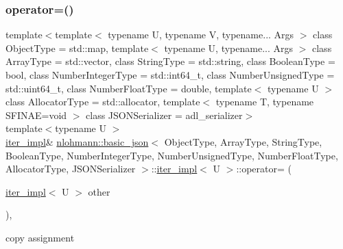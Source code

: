 \subsubsection{\texorpdfstring{operator=()}{operator=()}}
{\footnotesize\ttfamily template$<$template$<$ typename U, typename V, typename... Args $>$ class Object\+Type = std\+::map, template$<$ typename U, typename... Args $>$ class Array\+Type = std\+::vector, class String\+Type  = std\+::string, class Boolean\+Type  = bool, class Number\+Integer\+Type  = std\+::int64\+\_\+t, class Number\+Unsigned\+Type  = std\+::uint64\+\_\+t, class Number\+Float\+Type  = double, template$<$ typename U $>$ class Allocator\+Type = std\+::allocator, template$<$ typename T, typename S\+F\+I\+N\+A\+E=void $>$ class J\+S\+O\+N\+Serializer = adl\+\_\+serializer$>$ \\
template$<$typename U $>$ \\
\mbox{\hyperlink{classnlohmann_1_1basic__json_1_1iter__impl}{iter\+\_\+impl}}\& \mbox{\hyperlink{classnlohmann_1_1basic__json}{nlohmann\+::basic\+\_\+json}}$<$ Object\+Type, Array\+Type, String\+Type, Boolean\+Type, Number\+Integer\+Type, Number\+Unsigned\+Type, Number\+Float\+Type, Allocator\+Type, J\+S\+O\+N\+Serializer $>$\+::\mbox{\hyperlink{classnlohmann_1_1basic__json_1_1iter__impl}{iter\+\_\+impl}}$<$ U $>$\+::operator= (\begin{DoxyParamCaption}\item[{\mbox{\hyperlink{classnlohmann_1_1basic__json_1_1iter__impl}{iter\+\_\+impl}}$<$ U $>$}]{other }\end{DoxyParamCaption})\hspace{0.3cm}{\ttfamily [inline]}, {\ttfamily [noexcept]}}



copy assignment 


